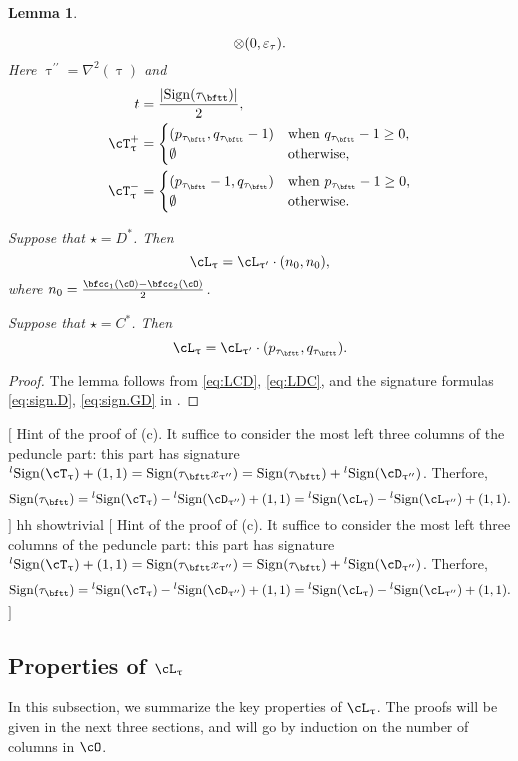 \documentclass[12pt,a4paper]{amsart}
\newcommand{\trivial}[2][]{\if\relax\detokenize{#1}\relax
  {%
      \color{orange} \vspace{0em} $[$  #2 $]$
      \color{black}
  }
  \else
\ifx#1h
\ifcsname showtrivial\endcsname
{%
    \color{orange} \vspace{0em}  $[$ #2 $]$
    \color{black}
}
\fi
\else {\red Wrong argument!} \fi
\fi
}
\def\abs#1{\left|{#1}\right|}
\def\DD{\nabla}
\numberwithin{equation}{section}
\newtheorem{lem}[thm]{Lemma}
\theoremstyle{remark}
\def\lsign{{}^l\mathrm{Sign}}
\def\ssign{\mathrm{Sign}}
\def\uptaupp{\uptau^{\prime\prime}}
\begin{document}
\begin{lem}
\begin{enuma}
\begin{equation}
    \otimes(0,\varepsilon_{\tau}).
  \end{equation}
  Here $\uptaupp = \DD^{2}(\uptau)$ and
  \[
  \begin{split}
    t &  = \frac{\abs{\ssign(\tau_{\bftt})}}{2},\\
    \pcT_{\uptau}& = \begin{cases} (p_{\tau_{\bftt}},q_{\tau_{\bftt}}-1) &
       \text{when
      } q_{\tau_{\bftt}}-1\geq 0 , \\
      \emptyset & \text{otherwise},
    \end{cases}\\
    \ncT_{\uptau}& = \begin{cases} (p_{\tau_{\bftt}}-1,q_{\tau_{\bftt}}) &
       \text{when
      } p_{\tau_{\bftt}}-1\geq 0  ,\\
      \emptyset & \text{otherwise}.
    \end{cases}\\
  \end{split}
\]
\item
  Suppose that $\star = D^{*}$.  Then
  \[
    \ac_{\uptau}=\ac_{\uptau'} \cdot (n_{0},n_{0}),
  \]
  where $n_{0} = \frac{\bfcc_{1}(\cO)-\bfcc_{2}(\cO)}{2}$.
\item
  Suppose that $\star = C^{*}$.  Then
  \[
    \ac_{\uptau}=\ac_{\uptau'} \cdot (p_{\tau_{\bftt}},q_{\tau_{\bftt}}).
\]
\end{enuma}
\end{lem}
\begin{proof}
 The lemma follows from \eqref{eq:LCD}, \eqref{eq:LDC}, and  
 the signature formulas \eqref{eq:sign.D}, \eqref{eq:sign.GD}
 in . 
\end{proof}



\trivial[h]{Hint of the proof of (c). It suffice to consider the most left three
  columns of the peduncle part: this part has signature $\lsign(\cT_{\uptau})
  +(1,1) = \ssign(\tau_{\bftt}x_{\uptaupp})=
  \ssign(\tau_{\bftt})+\lsign(\cD_{\uptaupp})$. Therfore,
  \[\ssign(\tau_{\bftt}) = \lsign(\cT_{\uptau})-\lsign(\cD_{\uptaupp})
  + (1,1) = \lsign(\ac_{\uptau})-\lsign(\ac_{\uptaupp})+(1,1).
  \]
}

\subsection{Properties of $\ac_{\uptau}$}
\label{sec:ac}
In this subsection, we summarize the key properties of $\ac_{\uptau}$. The proofs will be given in the next three sections, and
will go by induction on the number of columns in $\cO$.
\end{document}
